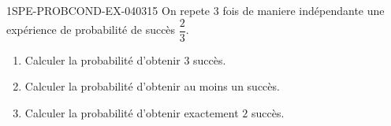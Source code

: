 \begin{exercice}{1SPE-PROBCOND-EX-040}{3}{15}
On repete $3$ fois de maniere indépendante une expérience de probabilité de succès $\dfrac{2}{3}$.

\begin{enumerate}
  \item Calculer la probabilité d'obtenir $3$ succès.
  \item Calculer la probabilité d'obtenir au moins un succès.
  \item Calculer la probabilité d'obtenir exactement $2$ succès.
\end{enumerate}
\end{exercice}
